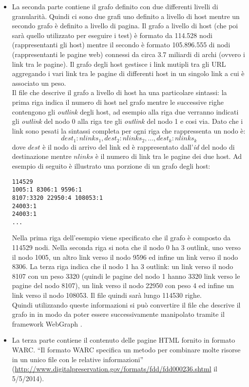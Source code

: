 \begin{itemize}
 
 \item La seconda parte contiene il grafo definito con due differenti livelli di granularità. Quindi ci sono due grafi uno definito a livello di host mentre un secondo grafo è definito a livello di pagina. Il grafo a livello di host (che poi sarà quello utilizzato per eseguire i test) è formato da 114.528 nodi (rappresentanti gli host) mentre il secondo è formato  105.896.555 di nodi (rappresentanti le pagine web)  connessi da circa 3.7 miliardi di archi (ovvero i link tra le pagine). Il grafo degli host gestisce i link mutipli tra gli URL aggregando i vari link tra le pagine di differenti host in un singolo link a cui è associato un peso.\\
 Il file che descrive il grafo a livello di host ha una particolare sintassi: la prima riga indica il numero di host nel grafo mentre le successive righe contengono gli \textit{outlink} degli host, ad esempio alla riga due verranno indicati gli \textit{outlink} del nodo 0 alla riga tre gli \textit{outlink} del nodo 1 e cosi via. Dato che i link sono pesati la sintassi completa per ogni riga che rappressenta un nodo è:
 $$
 dest_1:nlinks_1,dest_2:nlinks_2,...,dest_k:nlinks_k
 $$
 dove \(dest\) è il nodo di arrivo del link ed è rappresentato dall'\textit{id} del nodo di destinazione mentre \(nlinks\) è il numero di link tra le pagine dei due host.
 Ad esempio di seguito è illustrato una porzione di un grafo degli host:
\begin{lstlisting}[frame=trbl,postbreak=\space, breakindent=5pt, breaklines]
114529
1005:1 8306:1 9596:1 
8107:3320 22950:4 108053:1
24003:1
24003:1
...
\end{lstlisting}
Nella prima riga dell'esempio viene specificato che il grafo è composto da 114529 nodi. Nella seconda riga si nota che il nodo 0 ha 3 outlink, uno verso il nodo 1005, un altro link verso il nodo 9596 ed infine un link verso il nodo 8306. La terza riga indica che il nodo 1 ha 3 outlink: un link verso il nodo 8107 con un peso 3320 (quindi le pagine del nodo 1 hanno 3320 link verso le pagine del nodo 8107), un link verso il nodo 22950 con peso 4 ed infine un link verso il nodo 108053. Il file quindi sarà lungo 114530 righe.\\
Quindi utilizzando queste informazioni si può convertire il file che descrive il grafo in  in modo da poter essere successivamente manipolato tramite il framework WebGraph \cite{Boldi03thewebgraph}.
\item La terza parte contiene il contenuto delle pagine HTML fornito in formato WARC. ``Il formato WARC specifica un metodo per combinare molte risorse in un unico file con le relative informazioni'' (\url{http://www.digitalpreservation.gov/formats/fdd/fdd000236.shtml} il 5/5/2014).
\end{itemize}

